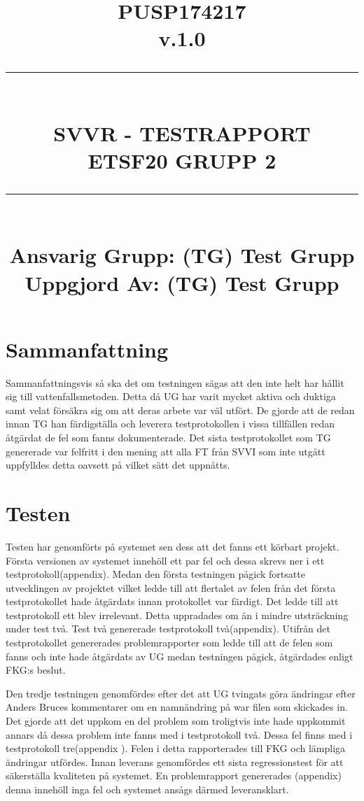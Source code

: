 \documentclass[paper=a4, fontsize=11pt,twoside]{article}
\title{
		\documentNumber{#1}																						
		\documentVersion{#2}																				
		\HRule{0.5pt} \\ %
		\LARGE \textbf{\uppercase{#3}} \\
		\large \textbf{\uppercase{ETSF20 Grupp 2}} 
		\HRule{2pt} \\ [1.5cm]    
		\normalsize            
		\documentResponsible{#4} \\ 
		\documentCreator{#4}  
	}
\newcommand{\HRule}[1]{\rule{\linewidth}{#1}}
\newcommand{\documentNumber}[1]{\centering PUSP1742#1 \\[1.0cm]}
\newcommand{\documentVersion}[1]{\centering \small{v.#1} \\[1.0cm]}
\newcommand{\documentResponsible}[1]{\centering  Ansvarig Grupp: #1}
\newcommand{\documentCreator}[1]{\centering Uppgjord Av: #1}
\newcommand{\grouptitlepage}[4]{ 
	\title{
		\documentNumber{#1}																						
		\documentVersion{#2}																				
		\HRule{0.5pt} \\ %
		\LARGE \textbf{\uppercase{#3}} \\
		\large \textbf{\uppercase{ETSF20 Grupp 2}} 
		\HRule{2pt} \\ [1.5cm]    
		\normalsize            
		\documentResponsible{#4} \\ 
		\documentCreator{#4}  
	}																							
	\maketitle																							
	\thispagestyle{empty} 																					
	\newpage 
}
\begin{document}
\grouptitlepage
{17}
{1.0}
{SVVR - Testrapport}
{(TG) Test Grupp} %
\tableofcontents
\section{Sammanfattning}
Sammanfattningsvis så ska det om testningen sägas att den inte helt har hållit sig till vattenfallsmetoden. Detta då UG har varit mycket aktiva och duktiga samt velat försäkra sig om att deras arbete var väl utfört. De gjorde att de redan innan TG han färdigställa och leverera testprotokollen i vissa tillfällen redan åtgärdat de fel som fanns dokumenterade. Det sista testprotokollet som TG genererade var felfritt i den mening att alla FT från SVVI som inte utgått uppfylldes detta oavsett på vilket sätt det uppnåtts.

\section{Testen}
Testen har genomförts på systemet sen dess att det fanns ett körbart projekt. Första versionen av systemet innehöll ett par fel och dessa skrevs ner i ett testprotokoll(appendix). Medan den första testningen pågick fortsatte utvecklingen av projektet vilket ledde till att flertalet av felen från det första testprotokollet hade åtgärdats innan protokollet var färdigt. Det ledde till att testprotokoll ett blev irrelevant.  Detta uppradades om än i mindre utsträckning under test två. Test två genererade testprotokoll två(appendix). Utifrån det testprotokollet genererades problemrapporter som ledde till att de felen som fanns och inte hade åtgärdats av UG medan testningen pågick, åtgärdades enligt FKG:s beslut.

Den tredje testningen genomfördes efter det att UG tvingats göra ändringar efter Anders Bruces kommentarer om en namnändring på war filen som skickades in. Det gjorde att det uppkom en del problem som troligtvis inte hade uppkommit annars då dessa problem inte fanns med i testprotokoll två. Dessa fel finns med i testprotokoll tre(appendix ). Felen i detta rapporterades till FKG och lämpliga ändringar utfördes. Innan leverans genomfördes ett sista regressionstest för att säkerställa kvaliteten på systemet. En problemrapport genererades (appendix) denna innehöll inga fel och systemet ansågs därmed leveransklart.
\end{document}
